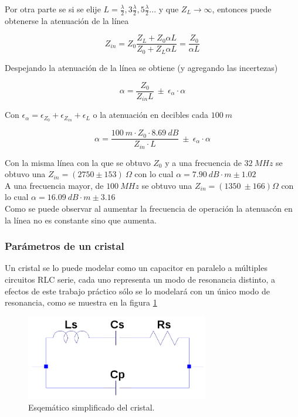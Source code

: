\documentclass[a4paper,10pt]{article}
\begin{document}
		\indent Por otra parte se si se elije 
		$L=\frac{\lambda}{2},3\frac{\lambda}{2}, 5\frac{\lambda}{2} ...$ y que 
		$Z_L\rightarrow\infty$, entonces puede obtenerse la atenuaci\'on de la 
		l\'inea
		
		$$Z_{in}=Z_0\frac{Z_L+Z_0\alpha L}{Z_0+Z_L\alpha L}=\frac{Z_0}{\alpha L}$$
		
		\indent Despejando la atenuaci\'on de la l\'inea se obtiene (y agregando
		las incertezas)
		
		$$\alpha=\frac{Z_0}{Z_{in} L}~\pm~\epsilon_{\alpha}\cdot\alpha$$
		
		\indent Con $\epsilon_{\alpha}=\epsilon_{Z_0}+\epsilon_{Z_{in}}+
		\epsilon_{L}$ o la atenuaci\'on en decibles cada $100~m$
		
		$$\alpha=\frac{100~m\cdot Z_0\cdot8.69~dB}{Z_{in}\cdot L}~\pm~
		\epsilon_{\alpha}\cdot \alpha$$
		
		\indent Con la misma l\'inea con la que se obtuvo $Z_0$ y a una 
		frecuencia de $32~MHz$ se obtuvo una $Z_{in}=(2750\pm153)~\Omega$ con
		lo cual $\alpha=7.90~dB\cdot m\pm1.02$ \\
		\indent A una frecuencia mayor, de $100~MHz$ se obtuvo una 
		$Z_{in}=(1350~\pm166)\Omega$ con lo cual 
		$\alpha=16.09~dB\cdot m\pm3.16$\\
		\indent Como se puede observar al aumentar la frecuencia de operaci\'on 
		la atenuac\'on en la l\'inea no es constante sino que aumenta.
		
		\subsubsection{Par\'ametros de un cristal}	
		
		\indent Un cristal se lo puede modelar como un capacitor en paralelo a 
		múltiples circuitos RLC serie, cada uno representa un modo de resonancia
		distinto, a efectos de este trabajo práctico sólo se lo modelará con un 
		único modo de resonancia, como se muestra en la figura \ref{img004}

		\begin{figure}[!htb]
			\centering
			\includegraphics[width=8cm]{Imagenes/esqXtal.png}
			\caption{Esqemático simplificado del cristal.}
			\label{img004} 
		\end{figure}
\end{document}
